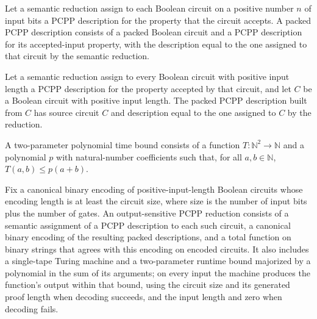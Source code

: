\begin{definition}
\label{FABL.PackedPCPPDescription}
\leanok
{}
Let a semantic reduction assign to each Boolean circuit on a positive number $n$ of
input bits a PCPP description for the property that the circuit accepts. A packed PCPP
description consists of a packed Boolean circuit and a PCPP description for its
accepted-input property, with the description equal to the one assigned to that circuit
by the semantic reduction.
\end{definition}

\begin{definition}
\label{FABL.packPCPPDescription}
\leanok
{}
Let a semantic reduction assign to every Boolean circuit with positive input length a
PCPP description for the property accepted by that circuit, and let $C$ be a Boolean
circuit with positive input length. The packed PCPP description built from $C$ has
source circuit $C$ and description equal to the one assigned to $C$ by the reduction.
\end{definition}

\begin{definition}
\leanok
A two-parameter polynomial time bound consists of a function
$T\colon\mathbb{N}^2\to\mathbb{N}$ and a polynomial $p$ with natural-number coefficients
such that, for all $a,b\in\mathbb{N}$, $T(a,b)\le p(a+b)$.
\end{definition}

\begin{definition}
\label{FABL.OutputSensitivePCPPReduction}
\leanok
{}
Fix a canonical binary encoding of positive-input-length Boolean circuits whose encoding
length is at least the circuit size, where size is the number of input bits plus the
number of gates. An output-sensitive PCPP reduction consists of a semantic assignment of
a PCPP description to each such circuit, a canonical binary encoding of the resulting
packed descriptions, and a total function on binary strings that agrees with this
encoding on encoded circuits. It also includes a single-tape Turing machine and a
two-parameter runtime bound majorized by a polynomial in the sum of its arguments; on
every input the machine produces the function’s output within that bound, using the
circuit size and its generated proof length when decoding succeeds, and the input length
and zero when decoding fails.
\end{definition}

